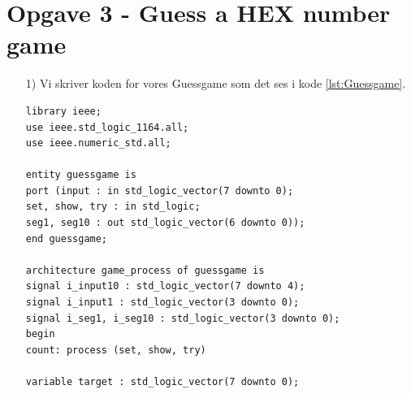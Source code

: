 \section{Opgave 3 - Guess a HEX number game}
\begin{enumerate}
	\item[1)]
	Vi skriver koden for vores Guessgame som det ses i kode \ref{lst:Guessgame}.\\
	\begin{lstlisting}[caption={Behavioral style kode for Guessgame},label={lst:Guessgame}]
library ieee;
use ieee.std_logic_1164.all;
use ieee.numeric_std.all;

entity guessgame is 
port (input : in std_logic_vector(7 downto 0);
set, show, try : in std_logic;
seg1, seg10 : out std_logic_vector(6 downto 0));
end guessgame;

architecture game_process of guessgame is
signal i_input10 : std_logic_vector(7 downto 4);
signal i_input1 : std_logic_vector(3 downto 0);
signal i_seg1, i_seg10 : std_logic_vector(3 downto 0);
begin
count: process (set, show, try)

variable target : std_logic_vector(7 downto 0);


\end{lstlisting}
\end{enumerate}
